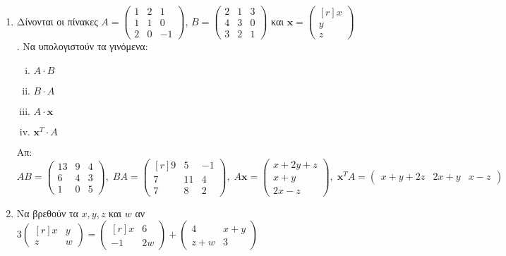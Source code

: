 \begin{enumerate}
  \item Δίνονται οι πίνακες $ A = 
    \begin{pmatrix}
      1 & 2 & 1 \\
      1 & 1 & 0 \\
      2 & 0 & -1
    \end{pmatrix} $, $ B= 
    \begin{pmatrix}
      2 & 1 & 3 \\
      4 & 3 & 0 \\
      3 & 2 & 1
    \end{pmatrix} $ και $ \mathbf{x} =  
    \begin{pmatrix*}[r] x \\ y \\ z \end{pmatrix*} $. Να υπολογιστούν τα γινόμενα:
    \begin{enumerate}[i)]
      \item $ A\cdot B $
      \item $ B\cdot A $
      \item $A \cdot \mathbf{x} $
      \item $ \mathbf{x}^{T} \cdot A$
    \end{enumerate} 
    \hfill Απ: $ \scriptstyle{AB= 
    \begin{pmatrix}
      13 & 9 & 4 \\
      6 & 4 & 3 \\
      1 & 0 & 5
    \end{pmatrix}, \;  BA = 
    \begin{pmatrix*}[r]
      9 & 5 & -1 \\
      7 & 11 & 4 \\
      7 & 8 & 2
    \end{pmatrix*}, \; A \mathbf{x} = 
    \begin{pmatrix*} x+2y+z \\ x+y \\ 2x-z \end{pmatrix*}, \;  \mathbf{x}^{T}A = 
    \begin{pmatrix*}
      x+y+2z & 2x+y & x-z
  \end{pmatrix*}} $  

\item Να βρεθούν τα $ x,y, z $ και $ w $ αν $ 3 
  \begin{pmatrix*}[r]
    x & y \\
    z &w
  \end{pmatrix*} = 
  \begin{pmatrix*}[r]
    x & 6 \\
    -1 & 2w
  \end{pmatrix*} + 
  \begin{pmatrix*}
    4 & x+y \\
    z+w & 3
  \end{pmatrix*} $ 


\end{enumerate}
